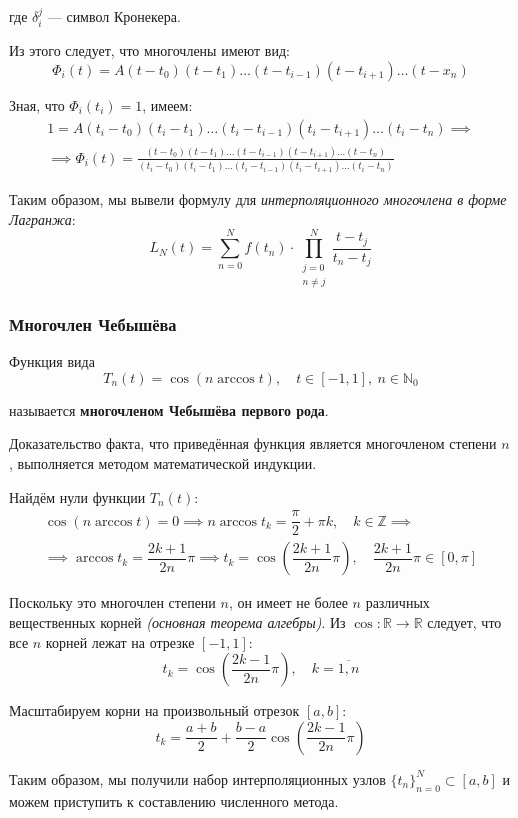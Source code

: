 где \( \delta_i^j \) --- символ Кронекера.

Из этого следует, что многочлены имеют вид:
\[
  \Phi_i(t) = A(t - t_0)(t - t_1) \dots (t - t_{i-1})(t - t_{i+1}) \dots (t - x_n)
\]

Зная, что \( \Phi_i(t_i)=1 \), имеем:
\[
  \begin{gathered}
    1 = A(t_i - t_0)(t_i - t_1) \dots (t_i - t_{i-1})(t_i - t_{i+1}) \dots (t_i - t_n)\implies\\
    \implies\Phi_i(t) = \frac{(t - t_0)(t - t_1) \dots (t - t_{i-1})(t - t_{i+1}) \dots (t - t_n)}{(t_i - t_0)(t_i - t_1) \dots (t_i - t_{i-1})(t_i - t_{i+1}) \dots (t_i - t_n)}
  \end{gathered}
\]

Таким образом, мы вывели формулу для \textit{интерполяционного многочлена в форме Лагранжа}:
\[
  L_N(t)=\sum_{n=0}^N f(t_n)\cdot\prod_{\substack{j=0\\ n\neq j}}^N\dfrac{t-t_j}{t_n-t_j}
\]

\subsubsection{Многочлен Чебышёва}

Функция вида
\[
  T_n(t)=\cos(n\arccos t),\quad t\in[-1,1],\ n\in\mathbb{N}_0
\]

называется \textbf{многочленом Чебышёва первого рода}.

Доказательство факта, что приведённая функция является многочленом степени \( n \), выполняется методом математической индукции.

Найдём нули функции \( T_n(t) \):
\[
  \begin{gathered}
    \cos(n\arccos t)=0\implies n\arccos t_k=\dfrac{\pi}{2}+\pi k,\quad k\in\mathbb{Z}\implies\\
    \implies\arccos t_k=\dfrac{2k+1}{2n}\pi\implies t_k=\cos\left(\dfrac{2k+1}{2n}\pi\right),\quad\dfrac{2k+1}{2n}\pi\in[0,\pi]
  \end{gathered}
\]

Поскольку это многочлен степени \( n \), он имеет не более \( n \) различных вещественных корней \textit{(основная теорема алгебры)}. Из \( \cos\colon\mathbb{R}\to\mathbb{R} \) следует, что все \( n \) корней лежат на отрезке \( [-1,1] \):
\[
  t_k=\cos\left(\dfrac{2k-1}{2n}\pi\right),\quad k=\overline{1,n}
\]

Масштабируем корни на произвольный отрезок \( [a,b] \):
\[
  t_k=\dfrac{a+b}{2}+\dfrac{b-a}{2}\cos\left(\dfrac{2k-1}{2n}\pi\right)
\]

Таким образом, мы получили набор интерполяционных узлов \( \{t_n\}_{n=0}^N\subset[a,b] \) и можем приступить к составлению численного метода.
